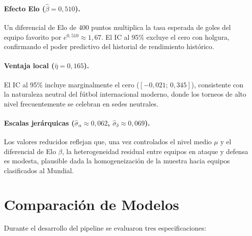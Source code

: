 \documentclass[12pt,a4paper]{article}
\begin{document}
\paragraph{Efecto Elo ($\hat{\beta} = 0{,}510$).}
Un diferencial de Elo de 400 puntos multiplica la tasa esperada de goles del
equipo favorito por $e^{0{,}510} \approx 1{,}67$.
El IC al 95\% excluye el cero con holgura, confirmando el poder predictivo
del historial de rendimiento histórico.

\paragraph{Ventaja local ($\hat{\eta} = 0{,}165$).}
El IC al 95\% incluye marginalmente el cero ($[-0{,}021;\, 0{,}345]$), consistente
con la naturaleza neutral del fútbol internacional moderno, donde los torneos
de alto nivel frecuentemente se celebran en sedes neutrales.

\paragraph{Escalas jerárquicas ($\hat{\sigma}_\alpha \approx 0{,}062$, $\hat{\sigma}_\delta \approx 0{,}069$).}
Los valores reducidos reflejan que, una vez controlados el nivel medio $\mu$ y
el diferencial de Elo $\beta$, la heterogeneidad residual entre equipos en
ataque y defensa es modesta, plausible dada la homogeneización de la muestra
hacia equipos clasificados al Mundial.

\section{Comparación de Modelos}
\label{sec:model-comparison}

Durante el desarrollo del pipeline se evaluaron tres especificaciones:
\end{document}
